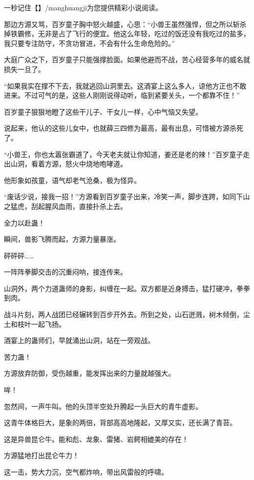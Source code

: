
\begin{this_body}

一秒记住【】/manghuangji为您提供精彩小说阅读。

那边方源又骂，百岁童子胸中怒火越盛，心思：“小兽王虽然强悍，但之所以斩杀掉铁霸修，无非是占了飞行的便宜。他这么年轻，吃过的饭还没有我吃过的盐多，我只要专注防守，不贪功冒进，不会有什么生命危险的。”

大庭广众之下，百岁童子只能强撑脸面。如果他避而不战，苦心经营多年的威名就损失一旦了。

“如果我实在撑不下去，我就逃回山洞里去。这酒宴上这么多人，谅他方正也不敢进来。不过可气的是，这些人刚刚说得动听，临到紧要关头，一个都靠不住！”

百岁童子狠狠地瞪了这些干儿子、干女儿一样，心中气恼又失望。

说起来，他认的这些儿女中，也就薛三四修为最高，最有出息，可惜被方源杀死了。

“小兽王，你也太嚣张霸道了，今天老夫就让你知道，姜还是老的辣！”百岁童子走出山洞，看着方源，怒火中烧地咆哮道。

他形象如孩童，语气却老气沧桑，极为怪异。

“废话少说，接我一招！”方源看到百岁童子出来，冷笑一声，脚步连跨，如同下山之猛虎，刮起腥风血雨，直接扑杀上去。

全力以赴蛊！

瞬间，兽影飞腾而起，方源力量暴涨。

砰砰砰……

一阵阵拳脚交击的沉重闷响，接连传来。

山洞外，两个力道蛊师的身影，纠缠在一起。双方都是近身搏击，猛打硬冲，拳拳到肉。

战斗片刻，两人战团已经辗转到百步开外去。所到之处，山石迸溅，树木倾倒，尘土和枝叶一起飞扬。

酒宴上的蛊师们，早就涌出山洞，站在一旁观战。

苦力蛊！

方源放弃防御，受伤越重，能发挥出来的力量就越强大。

哞！

忽然间，一声牛叫。他的头顶半空处升腾起一头巨大的青牛虚影。

这青牛体格巨大，是象的两倍，背部高高地隆起，又厚又实，还长满了青苔。

这是异兽昆仑牛。能和彪、龙象、雷猪、岩鳄相媲美的存在！

方源猛地打出昆仑牛力！

这一击，势大力沉，空气都炸响，带出风雷般的呼啸。


\end{this_body}
